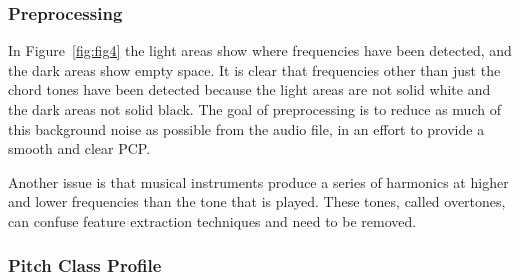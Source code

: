 \documentclass{sig-alternate}
\begin{document}
\subsubsection{Preprocessing}

In Figure~\ref{fig:fig4} the light areas show where frequencies have been detected, and the dark areas show empty space. It is clear that frequencies other than just the chord tones have been detected because the light areas are not solid white and the dark areas not solid black. The goal of preprocessing is to reduce as much of this background noise as possible from the audio file, in an effort to provide a smooth and clear PCP. 


Another issue is that musical instruments produce a series of harmonics at higher and lower frequencies than the tone that is played. These tones, called overtones, can confuse feature extraction techniques and need to be removed.



\subsubsection{Pitch Class Profile} 
\end{document}
